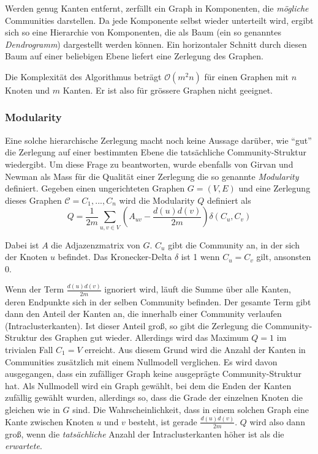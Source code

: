 Werden genug Kanten entfernt, zerfällt ein Graph in Komponenten, die
\emph{mögliche} Communities darstellen. Da jede Komponente selbst
wieder unterteilt wird, ergibt sich so eine Hierarchie von
Komponenten, die als Baum (ein so genanntes \emph{Dendrogramm})
dargestellt werden können. Ein horizontaler Schnitt durch diesen
Baum auf einer beliebigen Ebene liefert eine Zerlegung des Graphen.

Die Komplexität des Algorithmus beträgt $\mathcal{O}(m^2n)$ für
einen Graphen mit $n$ Knoten und $m$ Kanten. Er ist also für
grössere Graphen nicht geeignet.

\subsubsection{Modularity}
\label{sec:modularity}

Eine solche hierarchische Zerlegung macht noch keine Aussage
darüber, wie ``gut'' die Zerlegung auf einer bestimmten Ebene die
tatsächliche Community-Struktur wiedergibt. Um diese Frage zu
beantworten, wurde ebenfalls von Girvan und Newman als Mass für die
Qualität einer Zerlegung die so genannte \emph{Modularity}
definiert\cite{Newman2004}. Gegeben einen ungerichteten Graphen $G=(V,
E)$ und eine Zerlegung dieses Graphen $\mathcal{C} = C_1, ..., C_n$
wird die Modularity $Q$ definiert als
\begin{equation}
  \label{eq:modularity}
  Q =
  \frac{1}{2m}\sum_{u, v \in
    V}\left(A_{uv}-\frac{d(u)d(v)}{2m}\right)\delta\left(C_u, C_v\right)
\end{equation}

Dabei ist $A$ die Adjazenzmatrix von $G$. $C_u$ gibt die Community an,
in der sich der Knoten $u$ befindet. Das Kronecker-Delta $\delta$
ist 1 wenn $C_u = C_v$ gilt, ansonsten 0.

Wenn der Term $\frac{d(u)d(v)}{2m}$ ignoriert wird, läuft die Summe
über alle Kanten, deren Endpunkte sich in der selben Community
befinden. Der gesamte Term gibt dann den Anteil der Kanten an, die
innerhalb einer Community verlaufen (Intraclusterkanten). Ist dieser Anteil groß, so gibt
die Zerlegung die Community-Struktur des Graphen gut
wieder. Allerdings wird das Maximum $Q = 1$ im trivialen Fall $C_1 =
V$ erreicht. Aus diesem Grund wird die Anzahl der Kanten in
Communities zusätzlich mit einem Nullmodell verglichen. Es wird
davon ausgegangen, dass ein zufälliger Graph keine ausgeprägte
Community-Struktur hat. Als Nullmodell wird ein Graph gewählt, bei
dem die Enden der Kanten zufällig gewählt wurden, allerdings so,
dass die Grade der einzelnen Knoten die gleichen wie in $G$ sind.  Die
Wahrscheinlichkeit, dass in einem solchen Graph eine Kante zwischen
Knoten $u$ und $v$ besteht, ist gerade $\frac{d(u)d(v)}{2m}$. $Q$ wird
also dann groß, wenn die \emph{tatsächliche} Anzahl der
Intraclusterkanten höher ist als die \emph{erwartete}.

